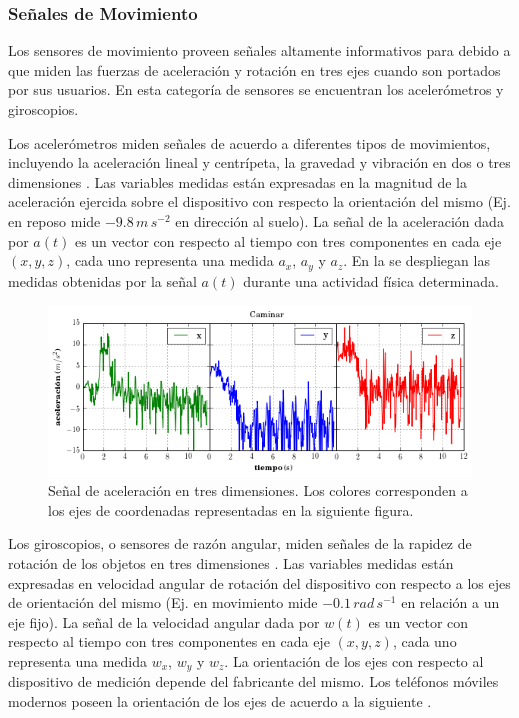 \subsubsection{Señales de Movimiento}

Los sensores de movimiento proveen señales altamente informativos
para  debido a que miden las fuerzas de aceleración y rotación
en tres ejes cuando son portados por sus usuarios. En esta categoría
de sensores se encuentran los acelerómetros y giroscopios. 

Los acelerómetros miden señales de acuerdo a diferentes tipos de movimientos,
incluyendo la aceleración lineal y centrípeta, la gravedad y vibración
en dos o tres dimensiones \cite{Goehl2007}. Las variables medidas
están expresadas en la magnitud de la aceleración ejercida sobre el
dispositivo con respecto la orientación del mismo (Ej. en reposo mide
$-9.8\,m\,s^{-2}$ en dirección al suelo). La señal de la aceleración
dada por $a(t)$ es un vector con respecto al tiempo con tres componentes
en cada eje $(x,y,z)$, cada uno representa una medida $a_{x}$, $a_{y}$
y $a_{z}$. En la  se despliegan las medidas
obtenidas por la señal $a(t)$ durante una actividad física determinada.

\begin{figure}[!tbph]
\begin{centering}
\includegraphics[width=1\columnwidth]{capitulo-4/graphics/signal_a3d}
\par\end{centering}
\caption[Señal de aceleración]{\label{fig4:muestra-ac}Señal de aceleración en tres dimensiones.
Los colores corresponden a los ejes de coordenadas representadas en
la siguiente figura.}
\end{figure}

Los giroscopios, o sensores de razón angular, miden señales de la
rapidez de rotación de los objetos en tres dimensiones \cite{Goehl2007}.
Las variables medidas están expresadas en velocidad angular de rotación
del dispositivo con respecto a los ejes de orientación del mismo (Ej.
en movimiento mide \foreignlanguage{english}{$-0.1\,rad\,s^{-1}$}
en relación a un eje fijo). La señal de la velocidad angular dada
por $w(t)$ es un vector con respecto al tiempo con tres componentes
en cada eje $(x,y,z)$, cada uno representa una medida $w_{x}$, $w_{y}$
y $w_{z}$. La orientación de los ejes con respecto al dispositivo
de medición depende del fabricante del mismo. Los teléfonos móviles
modernos poseen la orientación de los ejes de acuerdo a la siguiente
.

